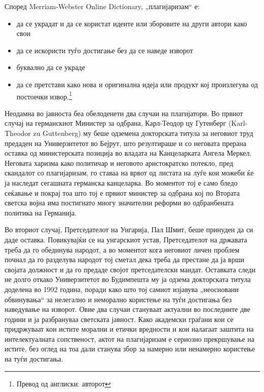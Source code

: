 \documentclass[12pt,a4paper]{article}
\begin{document}
\thispagestyle{empty}


Според Merriam-Webster Online Dictionary, „плагијаризам“ е: 
\begin{itemize}
  \renewcommand\labelitemi{--}
  \item да се украдат и да се користат идеите или зборовите на други автори како
  свои
  \item да се искористи туѓо достигање без да се наведе изворот
  \item буквално да се украде
  \item да се претстави како нова и оригинална идеја или продукт кој произлегува
  од постоечки извор.\footnote{Превод од англиски: авторот}
\end{itemize}

Неодамна во јавноста беа обелоденети два случаи на плагијатори. Во првиот случај
на германскиот Министер за одбрана, Карл-Теодор цу Гутенберг (Karl-Theodor zu
Guttenberg) му беше одземена докторската титула за неговиот труд предаден на
Универзитетот во Бејрут, што резултираше и со неговата прерана оставка од
министерската позиција во владата на Канцеларката Ангела Меркел. Неговата
харизма како политичар и неговото аристократско потекло, пред скандалот со
плагијаризам, го ставаа на врвот од листата на луѓе кои можеби ќе ја наследат
сегашната германска канцеларка. Во моментот тој е само бледо сеќавање и покрај
тоа што тој е првиот министер за одбрана кој по Втората светска војна има
постигнато многу значителни реформи во одбранбената политика на Германија.

Во вториот случај, Претседателот на Унгарија, Пал Шмит, беше принуден да си даде
оставка. Повикувајќи се на унгарскиот устав, Претседателот на државата треба да
го обединува народот, а во моментот кога неговиот личен проблем почнал да го
разделува народот тој сметал дека треба да престане да ја врши својата должност
и да го предаде својот претседателски мандат. Оставката следи не долго откако
Универзитетот во Будимпешта му ја одзема докторската титула доделена во 1992
година, поради како што тој самиот изјавува „неосновани обвинувања“ за нелегално
и неморално користење на туѓи достигања без наведување на изворот. Овие два
случаи стануваат актуални во последните две години и ја разбрануваа светската
јавност. Како академски граѓани кои се придржуваат кон истите морални и етички
вредности и кои налагаат заштита на интелектуалната сопственост, актот на
плагијаризам е сериозно прекршување на истите, без оглед на тоа дали станува
збор за намерно или ненамерно користење на туѓи достигања.
\end{document}
